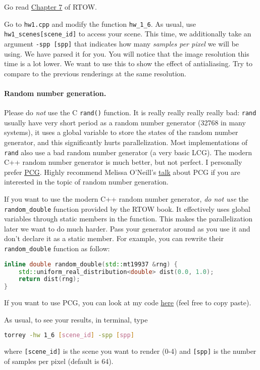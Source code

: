 Go read \href{https://raytracing.github.io/books/RayTracingInOneWeekend.html#antialiasing}{Chapter 7} of RTOW.

Go to \lstinline{hw1.cpp} and modify the function \lstinline{hw_1_6}. As usual, use \lstinline{hw1_scenes[scene_id]} to access your scene. This time, we additionally take an argument \lstinline{-spp [spp]} that indicates how many \emph{samples per pixel} we will be using. We have parsed it for you. You will notice that the image resolution this time is a lot lower. We want to use this to show the effect of antialiasing. Try to compare to the previous renderings at the same resolution.

\paragraph{Random number generation.} Please do \emph{not} use the C \lstinline{rand()} function. It is really really really really bad: \lstinline{rand} usually have very short period as a random number generator (32768 in many systems), it uses a global variable to store the states of the random number generator, and this significantly hurts parallelization. Most implementations of \lstinline{rand} also use a bad random number generator (a very basic LCG). The modern C++ random number generator is much better, but not perfect. I personally prefer \href{https://www.pcg-random.org/}{PCG}. Highly recommend Melissa O'Neill's \href{https://www.youtube.com/watch?v=45Oet5qjlms}{talk} about PCG if you are interested in the topic of random number generation.

If you want to use the modern C++ random number generator, \emph{do not use} the \lstinline{random_double} function provided by the RTOW book. It effectively uses global variables through static members in the function. This makes the parallelization later we want to do much harder. Pass your generator around as you use it and don't declare it as a static member. For example, you can rewrite their \lstinline{random_double} function as follow:
\begin{lstlisting}[language=C++]
inline double random_double(std::mt19937 &rng) {
    std::uniform_real_distribution<double> dist(0.0, 1.0);
    return dist(rng);
}
\end{lstlisting}
If you want to use PCG, you can look at my code \href{https://github.com/BachiLi/lajolla_public/src/pcg.h}{here} (feel free to copy paste).

As usual, to see your results, in terminal, type
\begin{lstlisting}[language=bash]
  torrey -hw 1_6 [scene_id] -spp [spp]
\end{lstlisting}
where \lstinline{[scene_id]} is the scene you want to render (0-4) and \lstinline{[spp]} is the number of samples per pixel (default is 64).

